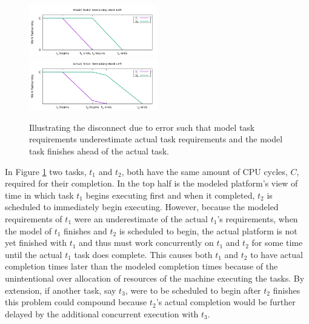 \documentclass[10pt]{csce}
\begin{document}
\begin{figure}
	\begin{center}
		\includegraphics[width=0.5\textwidth]{figures/UnderestimatedErrorEffect_ModelTaskWork.pdf}
		\includegraphics[width=0.5\textwidth]{figures/UnderestimatedErrorEffect_ActualTaskWork.pdf}
	\end{center}
	\caption{Illustrating the disconnect due to error such that model task
		requirements underestimate actual task requirements and the model
		task finishes ahead of the actual task.}
	\label{fig:underestimating}
\end{figure}

In Figure \ref{fig:underestimating} two tasks, $t_1$ and $t_2$, both have
the same amount of CPU cycles, $C$, required for their completion.  In the
top half is the modeled platform's view of time in which task $t_1$ begins
executing first and when it completed, $t_2$ is scheduled to immediately
begin executing.  However, because the modeled requirements of $t_1$ were
an underestimate of the actual $t_1$'s requirements, when the model of
$t_1$ finishes and $t_2$ is scheduled to begin, the actual platform is not
yet finished with $t_1$ and thus must work concurrently on $t_1$ and $t_2$
for some time until the actual $t_1$ task does complete.  This causes both
$t_1$ and $t_2$ to have actual completion times later than the modeled
completion times because of the unintentional over allocation of resources of
the machine executing the tasks.  By extension, if another task, say $t_3$,
were to be scheduled to begin after $t_2$ finishes this problem could compound
because $t_2$'s actual completion would be further delayed by the additional
concurrent execution with $t_3$.
\end{document}
